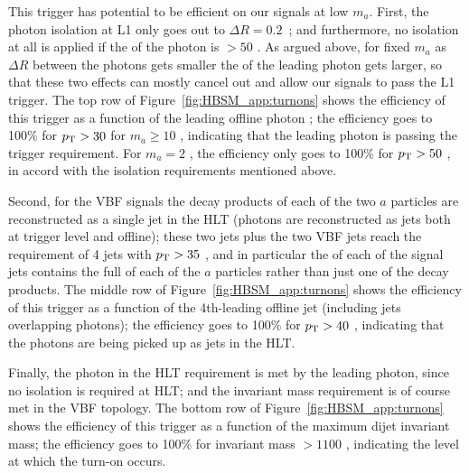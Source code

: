 This trigger has potential to be efficient on our signals at low $m_a$.
First, the photon isolation at L1 only goes out to $\Delta R=0.2$~\cite{Aad:2019wsl}; and furthermore, no isolation at all is applied if the \pt{} of the photon is $>50$ \GeV{}.
As argued above, for fixed $m_a$ as $\Delta R$ between the photons gets smaller the \pt{} of the leading photon gets larger, so that these two effects can mostly cancel out and allow our signals to pass the L1 trigger.
The top row of Figure~\ref{fig:HBSM_app:turnons} shows the efficiency of this trigger as a function of the leading offline photon \pt{}; the efficiency goes to 100\% for $p_{\text{T}}{}>30$ \GeV{} for $m_a \ge 10$ \GeV{}, indicating that the leading photon is passing the trigger requirement.
For $m_a=2$ \GeV{}, the efficiency only goes to 100\% for $p_{\text{T}}{}>50$ \GeV{}, in accord with the isolation requirements mentioned above.

Second, for the VBF signals the decay products of each of the two $a$ particles are reconstructed as a single jet in the HLT (photons are reconstructed as jets both at trigger level and offline); these two jets plus the two VBF jets reach the requirement of 4 jets with $p_{\text{T}}{}>35$ \GeV{}, and in particular the \pt{} of each of the signal jets contains the full \pt{} of each of the $a$ particles rather than just one of the decay products.
The middle row of Figure~\ref{fig:HBSM_app:turnons} shows the efficiency of this trigger as a function of the 4th-leading offline jet \pt{} (including jets overlapping photons); the efficiency goes to 100\% for $p_{\text{T}}{}>40$ \GeV{}, indicating that the photons are being picked up as jets in the HLT.

Finally, the photon in the HLT requirement is met by the leading photon, since no isolation is required at HLT; and the invariant mass requirement is of course met in the VBF topology.
The bottom row of Figure~\ref{fig:HBSM_app:turnons} shows the efficiency of this trigger as a function of the maximum dijet invariant mass; the efficiency goes to 100\% for invariant mass $>1100$ \GeV{}, indicating the level at which the turn-on occurs.

